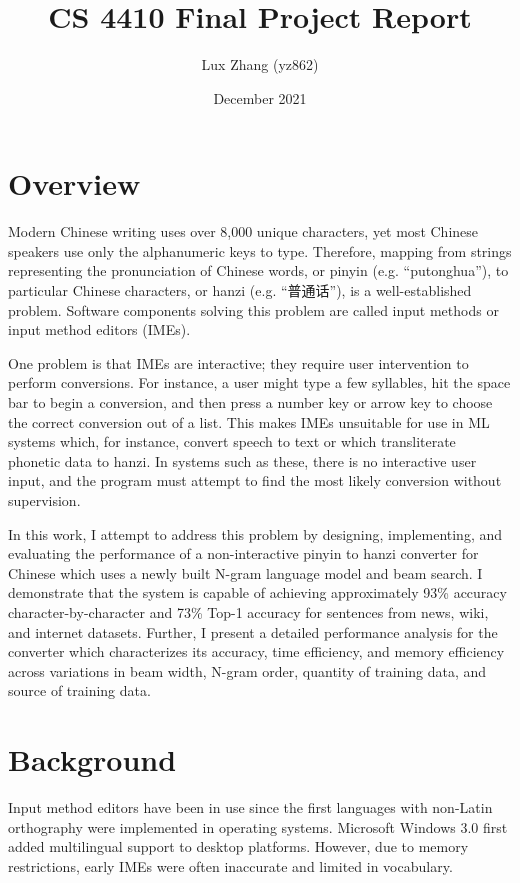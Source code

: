 \documentclass[11pt]{ctexart}
\title{CS 4410 Final Project Report}
\author{Lux Zhang (yz862)}
\date{December 2021}
\begin{document}
\maketitle

\section{Overview}

Modern Chinese writing uses over 8,000 unique characters, yet most
Chinese speakers use only the alphanumeric keys to type. 
Therefore, mapping from strings representing
the pronunciation of Chinese words, or pinyin (e.g. ``putonghua''),
to particular Chinese characters, or hanzi (e.g. ``普通话''),
is a well-established problem. Software components solving
this problem are called input methods or input method editors (IMEs).

One problem is that IMEs are interactive; they require user
intervention to perform conversions. For instance, a user might
type a few syllables, hit the space bar to begin a conversion,
and then press a number key or arrow key to choose the correct
conversion out of a list. This makes IMEs unsuitable for 
use in ML systems which, for instance, convert speech to text or 
which transliterate phonetic data to hanzi. In systems such as these,
there is no interactive user input, and the program must attempt
to find the most likely conversion without supervision.

In this work, I attempt to address this problem by
designing, implementing, and evaluating the performance of
a non-interactive pinyin to hanzi converter for Chinese 
which uses a newly built N-gram language model and beam search.
I demonstrate that the system is capable of achieving approximately
93\% accuracy character-by-character and 73\% Top-1 accuracy for 
sentences from news, wiki, and internet datasets.
Further, I present a detailed performance analysis for the converter
which characterizes its accuracy, time efficiency, and memory efficiency
across variations in beam width, N-gram order, quantity of training
data, and source of training data.


\section{Background}

Input method editors have been in use since the first languages with non-Latin
orthography were implemented in operating systems. Microsoft Windows 3.0
first added multilingual support to desktop platforms. However, due to
memory restrictions, early IMEs were often inaccurate and limited in vocabulary.
\end{document}
